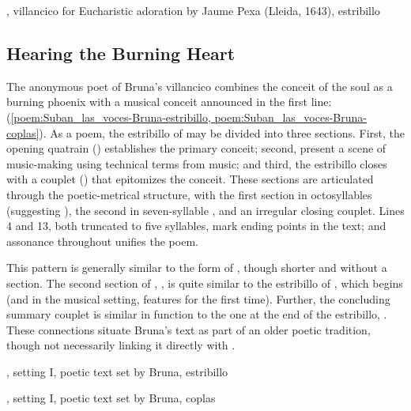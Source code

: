 {, villancico for Eucharistic adoration by Jaume Pexa
(Lleida, 1643), estribillo}

\subsection{Hearing the Burning Heart}

The anonymous poet of Bruna's villancico combines the conceit of the soul as a
burning phoenix with a musical conceit announced in the first line:  (\cref{poem:Suban_las_voces-Bruna-estribillo,
poem:Suban_las_voces-Bruna-coplas}).
As a poem, the estribillo of  may be divided into three
sections. 
First, the opening quatrain () establishes the primary conceit;
second,  present a scene of music-making using technical terms
from music; and third, the estribillo closes with a couplet ()
that epitomizes the conceit.
These sections are articulated through the poetic-metrical structure, with the
first section in octosyllables (suggesting ), the second in
seven-syllable , and an irregular closing couplet.
Lines 4 and 13, both truncated to five syllables, mark ending points in the
text; and assonance throughout unifies the poem.

This pattern is generally similar to the form of , though shorter and without a  section.  
The second section of , , is quite similar to the estribillo of , which begins
 (and in the musical
setting, features  for the first time).
Further, the concluding summary couplet is similar in function to the one at the
end of the  estribillo, .
These connections situate Bruna's text as part of an older poetic tradition,
though not necessarily linking it directly with .

{, setting I, poetic text set by Bruna,
estribillo}

{, setting I, poetic text set by Bruna, coplas}

